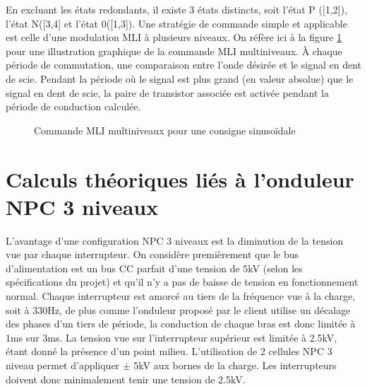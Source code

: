 En excluant les états redondants, il existe 3 états distincts, soit l'état P ([1,2]), l'état N([3,4] et l'état 0([1,3]). Une stratégie de commande simple et applicable est celle d'une modulation MLI à plusieurs niveaux. On réfère ici à la figure \ref{fig_MLI_ML} pour une illustration graphique de la commande MLI multiniveaux. À chaque période de commutation, une comparaison entre l'onde désirée et le signal en dent de scie. Pendant la période où le signal est plus grand (en valeur absolue) que le signal en dent de scie, la paire de transistor associée est activée pendant la période de conduction calculée. 

\begin{figure}[htb]

\caption{Commande MLI multiniveaux pour une consigne sinusoïdale}
\label{fig_MLI_ML}
\end{figure}

\section{Calculs théoriques liés à l'onduleur NPC 3 niveaux}
L'avantage d'une configuration NPC 3 niveaux est la diminution de la tension vue par chaque interrupteur. On considère premièrement que le bus d'alimentation est un bus CC parfait d'une tension de 5kV (selon les spécifications du projet) et qu'il n'y a pas de baisse de tension en fonctionnement normal. Chaque interrupteur est amorcé au tiers de la fréquence vue à la charge, soit à 330Hz, de plus comme l'onduleur proposé par le client utilise un décalage des phases d'un tiers de période, la conduction de chaque bras est donc limitée à 1ms sur 3ms. La tension vue sur l'interrupteur supérieur est limitée à 2.5kV, étant donné la présence d'un point milieu. L'utilisation de 2 cellules NPC 3 niveau permet d'appliquer $\pm$ 5kV aux bornes de la charge. Les interrupteurs doivent donc minimalement tenir une tension de 2.5kV. 

